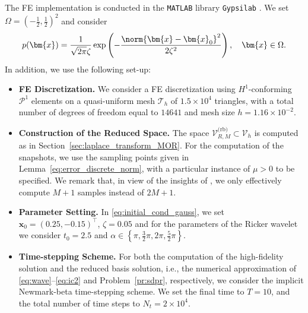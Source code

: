 The FE implementation is conducted in the {\tt MATLAB}
library {\tt Gypsilab} \cite{alouges2018fem}.
We set $\Omega = (-\frac{1}{2},\frac{1}{2})^2$ and
consider
\begin{equation}\label{eq:initial_cond_gauss}
	p (\bm{x} )
	=
	\frac{1}{\sqrt{2\pi}\zeta}
	\exp\left(-\frac{\norm{\bm{x}-\bm{x}_0}^2}{2\zeta^2} \right),
	\quad \bm{x} \in \Omega.
\end{equation}
In addition, we use the following set-up:
\begin{itemize}
	\item[(i)] {\bf FE Discretization.}
	We consider a FE discretization using $H^1$-conforming $\mathcal{P}^1$
	elements on a quasi-uniform mesh $\mathcal{T}_h$ of $1.5\times 10^4$ triangles,
	with a total number of degrees of freedom equal to $14641$ and mesh size $h = 1.16 \times 10^{-2}$.
	\item[(ii)] {\bf Construction of the Reduced Space.}
	The space $\mathcal{V}^{\text{(rb)}}_{R,M} \subset \mathcal{V}_h$ is computed
	as in Section~\ref{sec:laplace_transform_MOR}.
	For the computation of the snapshots, we use the 
    sampling points given in Lemma~\ref{eq:error_discrete_norm},
    with a particular instance of $\mu>0$ to be specified. 
	We remark that, in view of the insights of \cite[Section 5.4]{henriquez2024fast},
	we only effectively compute $M+1$ samples instead of $2M+1$.
	\item[(iii)] {\bf Parameter Setting.}
	In \eqref{eq:initial_cond_gauss}, we set $\bm{x}_0 = (0.25,-0.15)^\top$,
	$\zeta =0.05$ and for the parameters of the Ricker wavelet we consider $t_0 = 2.5$ and $\alpha \in  \left\{\pi, \frac{3}{2} \pi,2 \pi,\frac{5}{2} \pi\right\}$.
	\item[(iv)] {\bf Time-stepping Scheme.}
	For both the computation of the high-fidelity solution and the reduced basis solution, 
	i.e., the numerical approximation of \eqref{eq:wave}--\eqref{eq:ic2} and Problem~\ref{pr:sdpr},
	respectively, we consider the implicit Newmark-beta time-stepping scheme.
	We set the final time to $T=10$, and the total number of time steps
    to $N_t = 2 \times 10^4$.
\end{itemize}

